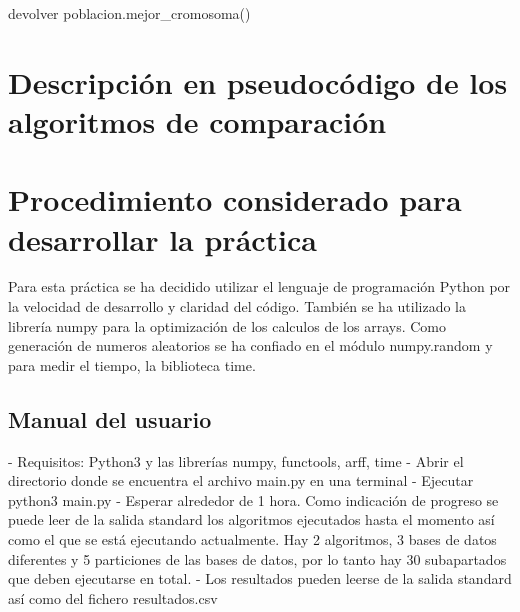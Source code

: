 \documentclass[12pt, spanish]{article}
\begin{document}
    devolver poblacion.mejor\_cromosoma()
\pagebreak
\subsection{}
\pagebreak
\subsection{}
\pagebreak
\subsection{}
\pagebreak
\subsection{}
\pagebreak
\subsection{}
\pagebreak

\section{Descripción en pseudocódigo de los algoritmos de comparación}

\pagebreak

\section{Procedimiento considerado para desarrollar la práctica}
Para esta práctica se ha decidido utilizar el lenguaje de programación Python por la velocidad de desarrollo y claridad del código. También se ha utilizado la librería numpy para la optimización de los calculos de los arrays. Como generación de numeros aleatorios se ha confiado en el módulo numpy.random y para medir el tiempo, la biblioteca time.  
\pagebreak
\subsection{Manual del usuario}
- Requisitos: Python3 y las librerías numpy, functools, arff, time
- Abrir el directorio donde se encuentra el archivo main.py en una terminal 
- Ejecutar python3 main.py 
- Esperar alrededor de 1 hora. Como indicación de progreso se puede leer de la salida standard los algoritmos ejecutados hasta el momento así como el que se está ejecutando actualmente. Hay 2 algoritmos, 3 bases de datos diferentes y 5 particiones de las bases de datos, por lo tanto hay 30 subapartados que deben ejecutarse en total. 
- Los resultados pueden leerse de la salida standard así como del fichero resultados.csv
\end{document}

